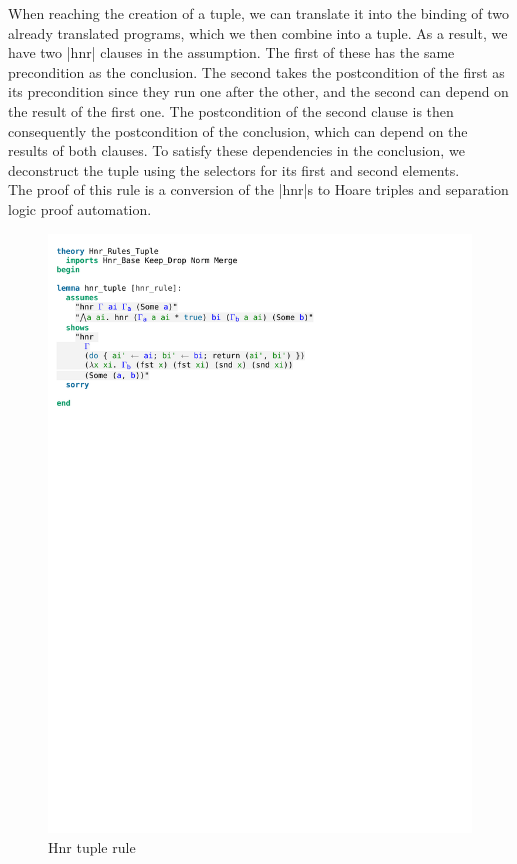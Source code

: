When reaching the creation of a tuple, we can translate it into the binding of two already translated programs, which we then combine into a tuple. As a result, we have two |hnr| clauses in the assumption. The first of these has the same precondition as the conclusion. The second takes the postcondition of the first as its precondition since they run one after the other, and the second can depend on the result of the first one. The postcondition of the second clause is then consequently the postcondition of the conclusion, which can depend on the results of both clauses. To satisfy these dependencies in the conclusion, we deconstruct the tuple using the selectors for its first and second elements. \\
The proof of this rule is a conversion of the |hnr|s to Hoare triples and separation logic proof automation.

\begin{figure}[htpb]
    \includegraphics[trim={0 22,4cm 0 2,4cm}, clip, width=1.00\textwidth]{figures/Theory_Hnr_Rules_Tuple.pdf}
    \caption[Hnr tuple rule]{Hnr tuple rule}
    \label{fig:hnr_tuple}
\end{figure}

